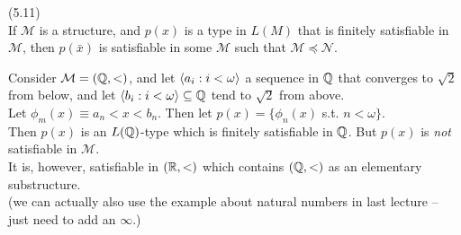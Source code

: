 \documentclass[a4paper]{article}
\begin{document}
\begin{thm} (5.11)\\
    If $\mathcal{M}$ is a structure, and $p(x)$ is a type in $L(M)$ that is finitely satisfiable in $\mathcal{M}$, then $p(\bar{x})$ is satisfiable in some $\mathcal{M}$ such that $\mathcal{M} \preccurlyeq \mathcal{N}$.
\end{thm}

\begin{eg}
    Consider $\mathcal{M} = (\mathbb{Q},<)$, and let $\langle a_i:i < \omega\rangle$ a sequence in $\mathbb{Q}$ that converges to $\sqrt{2}$ from below, and let $\langle b_i:i < \omega\rangle \subseteq \mathbb{Q}$ tend to $\sqrt{2}$ from above.\\
    Let $\phi_m(x) \equiv a_n < x < b_n$. Then let $p(x) = \{\phi_n(x)$ s.t. $n<\omega\}$.\\
    Then $p(x)$ is an $L(\mathbb{Q})$-type which is finitely satisfiable in $\mathbb{Q}$. But $p(x)$ is \emph{not} satisfiable in $\mathcal{M}$.\\
    It is, however, satisfiable in $(\mathbb{R},<)$ which contains $(\mathbb{Q},<)$ as an elementary substructure.\\
    (we can actually also use the example about natural numbers in last lecture -- just need to add an $\infty$.)
\end{eg}
\end{document}

